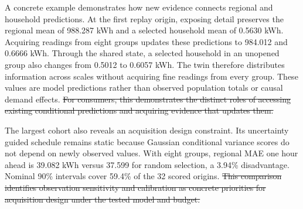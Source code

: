 \documentclass[conference]{IEEEtran}
\providecommand{\DIFdeltex}[1]{{\protect\color{red}\sout{#1}}}                      %
\providecommand{\DIFdelbegin}{} %
\providecommand{\DIFdelend}{} %
\providecommand{\DIFdel}[1]{\texorpdfstring{\DIFdeltex{#1}}{}} %
\begin{document}
A concrete example demonstrates how new evidence connects regional and household predictions. At the first replay origin, exposing detail preserves the regional mean of 988.287 kWh and a selected household mean of 0.5630 kWh. Acquiring readings from eight groups updates these predictions to 984.012 and 0.6666 kWh. Through the shared state, a selected household in an unopened group also changes from 0.5012 to 0.6057 kWh. The twin therefore distributes information across scales without acquiring fine readings from every group. These values are model predictions rather than observed population totals or causal demand effects.
\DIFdelbegin \DIFdel{For consumers, this demonstrates the distinct roles of accessing existing conditional predictions and acquiring evidence that updates them.
}\DIFdelend 

The largest cohort also reveals an acquisition design constraint. Its uncertainty guided schedule remains static because Gaussian conditional variance scores do not depend on newly observed values. With eight groups, regional MAE one hour ahead is 39.082 kWh versus 37.599 for random selection, a 3.94\% disadvantage. Nominal 90\% intervals cover 59.4\% of the 32 scored origins.
\DIFdelbegin \DIFdel{This comparison identifies observation sensitivity and calibration as concrete priorities for acquisition design under the tested model and budget.
}\DIFdelend 
\end{document}
